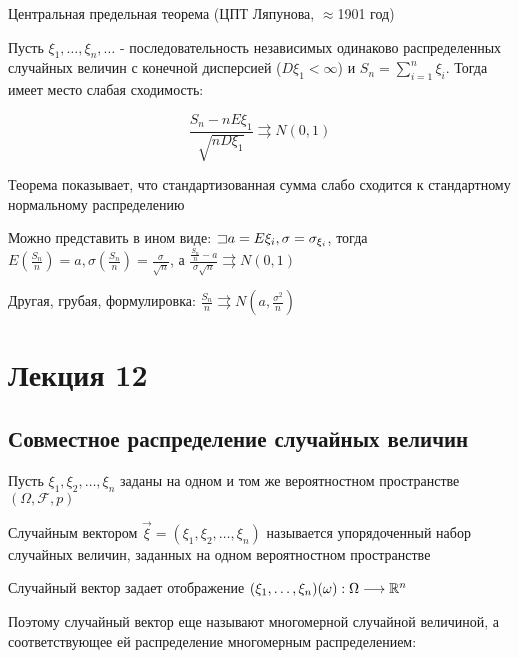 \documentclass[12pt]{article}
\begin{document}
    \hypertarget{centrallimittheorem}{}

    \begin{MyTheorem}
        \Ths Центральная предельная теорема (ЦПТ Ляпунова, $\approx$1901 год)

        Пусть $\xi_1, \dots, \xi_n, \dots$ - последовательность независимых одинаково распределенных случайных величин
        с конечной дисперсией ($D\xi_1 < \infty$) и $S_n = \sum_{i = 1}^n \xi_i$. Тогда имеет место слабая сходимость:

        \[\frac{S_n - nE\xi_1}{\sqrt{nD\xi_1}} \rightrightarrows N(0, 1)\]
    \end{MyTheorem}

    Теорема показывает, что стандартизованная сумма слабо сходится к стандартному нормальному распределению

    \Nota Можно представить в ином виде: $\mathord{\sqsupset} a = E\xi_i, \sigma = \sigma_{\xi_i}$, тогда $E\left(\frac{S_n}{n}\right) = a, \sigma\left(\frac{S_n}{n}\right) = \frac{\sigma}{\sqrt{n}}$, а $\frac{\frac{S_n}{n} - a}{\sigma \sqrt{n}} \rightrightarrows N(0, 1)$

    \Nota Другая, грубая, формулировка: $\frac{S_n}{n} \rightrightarrows N\left(a, \frac{\sigma^2}{n}\right)$


    \section{Лекция 12}

    \subsection{Совместное распределение случайных величин}

    Пусть $\xi_1, \xi_2, \dots, \xi_n$ заданы на одном и том же вероятностном пространстве $(\Omega, \mathcal{F}, p)$

    \Def Случайным вектором $\vec{\xi} = (\xi_1, \xi_2, \dots, \xi_n)$ называется упорядоченный набор случайных величин, заданных
    на одном вероятностном пространстве

    Случайный вектор задает отображение $(\xi_1, \dots, \xi_n) (\omega) : \Omega \longrightarrow \mathbb{R}^n$

    Поэтому случайный вектор еще называют многомерной случайной величиной, 
    а соответствующее ей распределение многомерным распределением: 
\end{document}
